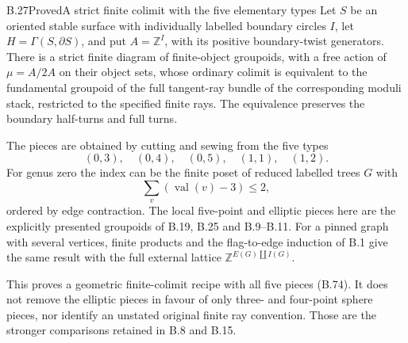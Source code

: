 \begin{result}{B.27}{Proved}{A strict finite colimit with the five elementary types}
Let $S$ be an oriented stable surface with individually labelled
boundary circles $I$, let $H=\Gamma(S,\partial S)$, and put
$A=\mathbb Z^I$, with its positive boundary-twist generators.
There is a strict finite diagram of finite-object groupoids,
with a free action of $\mu=A/2A$ on their object sets, whose
ordinary colimit is equivalent to the fundamental groupoid of
the full tangent-ray bundle of the corresponding moduli stack,
restricted to the specified finite rays.  The equivalence
preserves the boundary half-turns and full turns.

The pieces are obtained by cutting and sewing from the five
types
\[
 (0,3),\quad(0,4),\quad(0,5),\quad(1,1),\quad(1,2). \tag{B.74}
\]
For genus zero the index can be the finite poset of reduced
labelled trees $G$ with
\[
 \sum_v(\operatorname{val}(v)-3)\leq2,
\]
ordered by edge contraction.  The local five-point and elliptic
pieces here are the explicitly presented groupoids of B.19,
B.25 and B.9--B.11.  For a pinned graph with several vertices,
finite products and the flag-to-edge induction of B.1 give the
same result with the full external lattice
$\mathbb Z^{E(G)\amalg I(G)}$.

This proves a geometric finite-colimit recipe with all five
pieces (B.74).  It does not remove the elliptic pieces in favour
of only three- and four-point sphere pieces, nor identify an
unstated original finite ray convention.  Those are the stronger
comparisons retained in B.8 and B.15.
\end{result}
